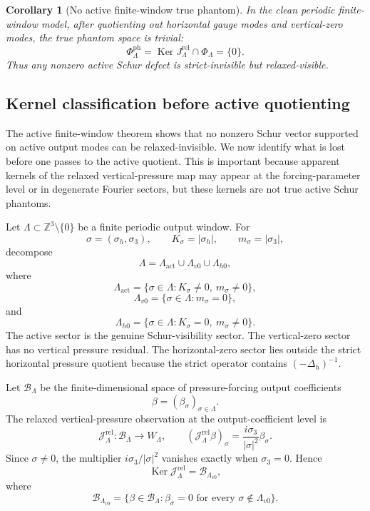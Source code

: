 \documentclass[11pt]{article}
\numberwithin{equation}{section}
\newtheorem{corollary}[theorem]{Corollary}
\DeclareMathOperator{\Ker}{Ker}
\begin{document}
\begin{corollary}[No active finite-window true phantom]\label{cor:no-active-finite-window-true-phantom}
In the clean periodic finite-window model, after quotienting out horizontal gauge modes and vertical-zero modes, the true phantom space is trivial:
\[
        \Phi_\Lambda^{\mathrm{ph}}
        =\Ker J_\Lambda^{\mathrm{rel}}\cap\Phi_\Lambda
        =\{0\}.
\]
Thus any nonzero active Schur defect is strict-invisible but relaxed-visible.
\end{corollary}

\subsection{Kernel classification before active quotienting}\label{subsec:kernel-classification-before-active-quotienting}

The active finite-window theorem shows that no nonzero Schur vector supported on active output modes can be relaxed-invisible.  We now identify what is lost before one passes to the active quotient.  This is important because apparent kernels of the relaxed vertical-pressure map may appear at the forcing-parameter level or in degenerate Fourier sectors, but these kernels are not true active Schur phantoms.

Let \(\Lambda\subset \mathbb Z^3\setminus\{0\}\) be a finite periodic output window.  For
\[
        \sigma=(\sigma_h,\sigma_3),
        \qquad
        K_\sigma=|\sigma_h|,
        \qquad
        m_\sigma=|\sigma_3|,
\]
decompose
\[
        \Lambda
        =\Lambda_{\mathrm{act}}
        \cup
        \Lambda_{v0}
        \cup
        \Lambda_{h0},
\]
where
\[
        \Lambda_{\mathrm{act}}
        =\{\sigma\in\Lambda:K_\sigma\neq0,
        \ m_\sigma\neq0\},
\]
\[
        \Lambda_{v0}
        =\{\sigma\in\Lambda:m_\sigma=0\},
\]
and
\[
        \Lambda_{h0}
        =\{\sigma\in\Lambda:K_\sigma=0,
        \ m_\sigma\neq0\}.
\]
The active sector is the genuine Schur-visibility sector.  The vertical-zero sector has no vertical pressure residual.  The horizontal-zero sector lies outside the strict horizontal pressure quotient because the strict operator contains \(( -\Delta_h)^{-1}\).

Let \(\mathcal B_\Lambda\) be the finite-dimensional space of pressure-forcing output coefficients
\[
        \beta=(\beta_\sigma)_{\sigma\in\Lambda}.
\]
The relaxed vertical-pressure observation at the output-coefficient level is
\[
        \mathcal J_\Lambda^{\mathrm{rel}}:\mathcal B_\Lambda\to W_\Lambda,
        \qquad
        (\mathcal J_\Lambda^{\mathrm{rel}}\beta)_\sigma
        =\frac{i\sigma_3}{|\sigma|^2}\beta_\sigma.
\]
Since \(\sigma\neq0\), the multiplier \(i\sigma_3/|\sigma|^2\) vanishes exactly when \(\sigma_3=0\).  Hence
\[
        \Ker \mathcal J_\Lambda^{\mathrm{rel}}
        =\mathcal B_{\Lambda_{v0}},
\]
where
\[
        \mathcal B_{\Lambda_{v0}}
        =\{\beta\in\mathcal B_\Lambda:
        \beta_\sigma=0
        \text{ for every }\sigma\notin\Lambda_{v0}\}.
\]
\end{document}
